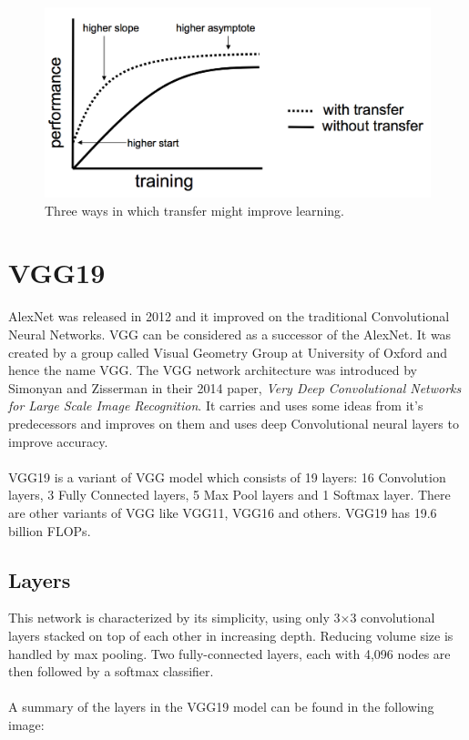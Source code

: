 \begin{figure}[h]
	\label{ss}
	\centering
	\includegraphics[width= 16 cm]{transfer.png}
	\caption{Three ways in which transfer might improve learning.}
\end{figure}

\section{VGG19}
AlexNet was released in 2012 and it improved on the traditional Convolutional Neural Networks. VGG can be considered as a successor of the AlexNet. It was created by a group called Visual Geometry Group at University of Oxford and hence the name VGG. The VGG network architecture was introduced by Simonyan and Zisserman in their 2014 paper, \emph{Very Deep Convolutional Networks for Large Scale Image Recognition}. It carries and uses some ideas from it's predecessors and improves on them and uses deep Convolutional neural layers to improve accuracy.\\\\
VGG19 is a variant of VGG model which consists of 19 layers: 16 Convolution layers, 3 Fully Connected layers, 5 Max Pool layers and 1 Softmax layer. There are other variants of VGG like VGG11, VGG16 and others. VGG19 has 19.6 billion FLOPs.\pagebreak

\subsection{Layers}
This network is characterized by its simplicity, using only 3×3 convolutional layers stacked on top of each other in increasing depth. Reducing volume size is handled by max pooling. Two fully-connected layers, each with 4,096 nodes are then followed by a softmax classifier.\\\\
A summary of the layers in the VGG19 model can be found in the following image:\\

